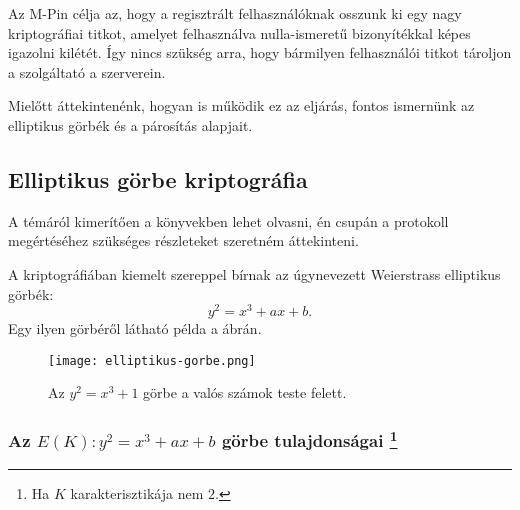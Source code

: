 Az M-Pin célja az, hogy a regisztrált felhasználóknak osszunk ki egy nagy kriptográfiai titkot, amelyet felhasználva nulla-ismeretű bizonyítékkal képes igazolni kilétét. Így nincs szükség arra, hogy bármilyen felhasználói titkot tároljon a szolgáltató a szerverein.

Mielőtt áttekintenénk, hogyan is működik ez az eljárás, fontos ismernünk az elliptikus görbék és a párosítás alapjait.

\subsection*{Elliptikus görbe kriptográfia}

A témáról kimerítően a \cite{ECCGuide, ECCHandbook} könyvekben lehet olvasni, én csupán a protokoll megértéséhez szükséges részleteket szeretném áttekinteni.

A kriptográfiában kiemelt szereppel bírnak az úgynevezett Weierstrass elliptikus görbék: $$y^2 = x^3 + ax + b.$$ Egy ilyen görbéről látható példa a  ábrán.

\begin{figure}[H]
    \centering
    \texttt{[image: elliptikus-gorbe.png]}
    \caption{Az $y^2 = x^3 + 1$ görbe a valós számok teste felett.}
    \label{Figure::ECC::EllipticCurve}
\end{figure}

\subsubsection*{Az $E(K) : y^2 = x^3 + ax + b$ görbe tulajdonságai \protect\footnote{Ha $K$ karakterisztikája nem $2$.}}

